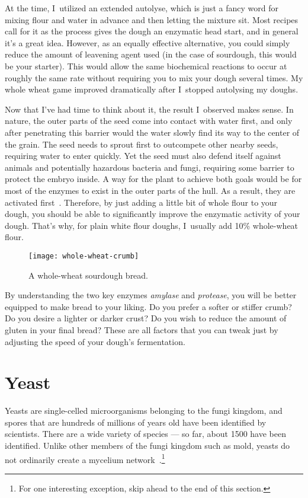 At the time, I~utilized an extended autolyse, which is just a fancy word for
mixing flour and water in advance and then letting the mixture sit. Most
recipes call for it as the process gives the dough an enzymatic head start, and
in general it's a great idea. However, as an equally effective alternative,
you could simply reduce the amount of leavening agent used (in the case of
sourdough, this would be your starter). This would allow the same biochemical
reactions to occur at roughly the same rate without requiring you to mix your
dough several times. My whole wheat game improved dramatically after I~stopped
autolysing my doughs.

Now that I've had time to think about it, the result I~observed makes sense.
In nature, the outer parts of the seed come into contact with water first, and
only after penetrating this barrier would the water slowly find its way to the
center of the grain. The seed needs to sprout first to outcompete other nearby
seeds, requiring water to enter quickly. Yet the seed must also defend itself
against animals and potentially hazardous bacteria and fungi, requiring some
barrier to protect the embryo inside. A way for the plant to achieve both goals
would be for most of the enzymes to exist in the outer parts of the hull. As a
result, they are activated first~\cite{enzymatic+activity+whole+wheat}. Therefore, by just adding a
little bit of whole flour to your dough, you should be able to significantly
improve the enzymatic activity of your dough. That's why, for plain white flour
doughs, I~usually add 10\% whole-wheat flour.

\begin{figure}
  \texttt{[image: whole-wheat-crumb]}
  \caption{A whole-wheat sourdough bread.}%
  \label{whole-wheat-crumb}
\end{figure}


By understanding the two key enzymes \emph{amylase} and \emph{protease}, you
will be better equipped to make bread to your liking. Do you prefer a softer
or stiffer crumb? Do you desire a lighter or darker crust? Do you wish to reduce
the amount of gluten in your final bread? These are all factors that you can
tweak just by adjusting the speed of your dough's fermentation.

\section{Yeast}

Yeasts are single-celled microorganisms belonging to the fungi kingdom, and
spores that are hundreds of millions of years old have been identified by
scientists. There are a wide variety of species --- so far, about \num{1500} have been
identified. Unlike other members of the fungi kingdom such as mold, yeasts do
not ordinarily create a mycelium network~\cite{molecular+mechanisms+yeast}.\footnote{For
one interesting exception, skip ahead to the end of this section.}

